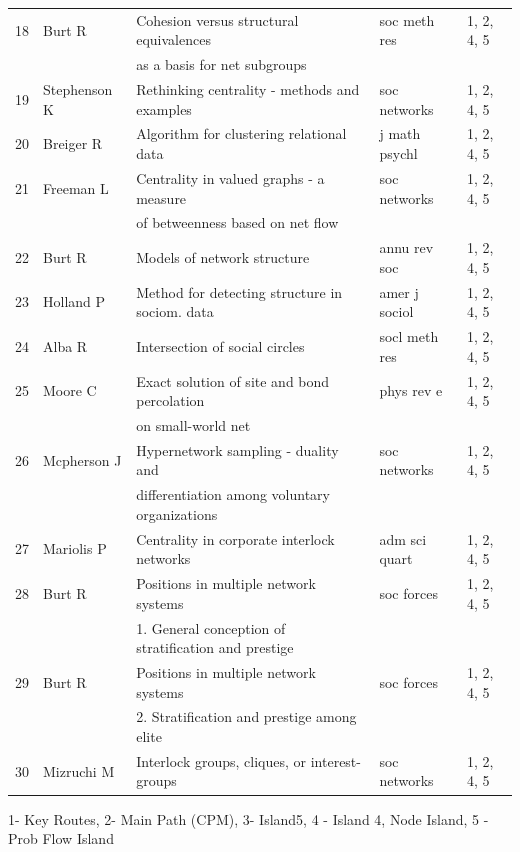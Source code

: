 \documentclass[hyperref={pdfstartview={FitBH -32768},
                         pdfpagemode=FullScreen,
                         plainpages=false,
                         colorlinks=true}
              ]{beamer}
\begin{document}
\begin{frame}[fragile]
\begin{tabular}{c|l|l|l|l|}
18&   	Burt R&   	 Cohesion versus structural equivalences&   	soc meth res&   	1, 2, 4, 5\\
&   	&   	as a basis for net subgroups&   	&   	\\
19&   	Stephenson K&   	 Rethinking centrality - methods and examples&   	soc networks&   	1, 2, 4, 5\\
20&   	Breiger R&   	 Algorithm for clustering relational data  &   j math psychl&   	1, 2, 4, 5\\
21&   	Freeman L&   	 Centrality in valued graphs - a measure &   soc networks&   	1, 2, 4, 5\\
&   	&   	 of betweenness based on net flow&   	&   	\\
22&   	Burt R&   	 Models of network structure&   	annu rev soc&   	1, 2, 4, 5\\
23&   	Holland P&   	 Method for detecting structure in sociom. data&   amer j sociol&   	1, 2, 4, 5\\
24&   	Alba R&   	 Intersection of social circles &   socl meth res&   	1, 2, 4, 5\\
25&   	Moore C&   	 Exact solution of site and bond percolation &   	phys rev e&   	1, 2, 4, 5\\
&   	&   	on small-world net&   	&   	\\
26&   	Mcpherson J&   	 Hypernetwork sampling - duality and &   	soc networks&   	1, 2, 4, 5\\
&   	&   	 differentiation among voluntary organizations&   	&   \\
27&   	Mariolis P&   	 Centrality in corporate interlock networks &   	adm sci quart&   	1, 2, 4, 5\\
28&   	Burt R&   	 Positions in multiple network systems &   	soc forces&   	1, 2, 4, 5\\
&   	&   	1. General conception of stratification and prestige &   	&   \\
29&   	Burt R&   	 Positions in multiple network systems &   	soc forces&   	1, 2, 4, 5\\
&   	&   	2. Stratification and prestige among elite &   	&   	\\
30&   	Mizruchi M&   Interlock groups, cliques, or interest-groups &   	soc networks&   	1, 2, 4, 5\\ \hline 
\end{tabular}
1- Key Routes, 2- Main Path (CPM), 3- Island5, 4 - Island 4, Node Island, 5 - Prob Flow Island

\end{frame}
\end{document}
